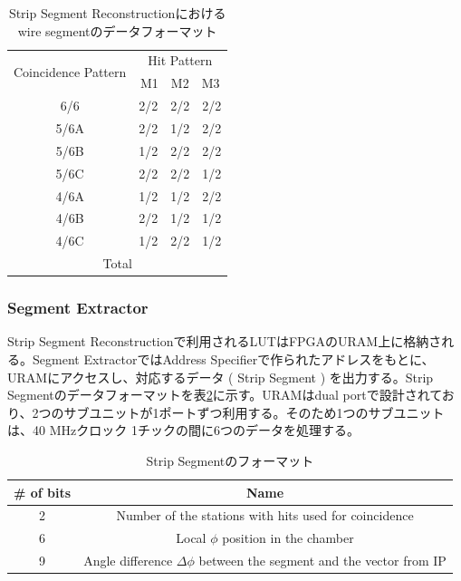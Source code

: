 \begin{table}[]
    \centering
    \caption{Strip Segment Reconstructionにおけるwire segmentのデータフォーマット}
    \label{tab:SegmentReco_strip}
    \begin{tabular}{|cc|}
    \hline
    \multicolumn{1}{|c|}{\multirow{2}{*}{Coincidence Pattern}} & Hit Pattern \\ \cline{2-2} 
    \multicolumn{1}{|c|}{}                                     & M1　M2　M3    \\ \hline\hline
    \multicolumn{1}{|c|}{6/6}                                  & 2/2　2/2　2/2 \\ \hline
    \multicolumn{1}{|c|}{5/6A}                                 & 2/2　1/2　2/2 \\ \hline
    \multicolumn{1}{|c|}{5/6B}                                 & 1/2　2/2　2/2 \\ \hline
    \multicolumn{1}{|c|}{5/6C}                                 & 2/2　2/2　1/2 \\ \hline
    \multicolumn{1}{|c|}{4/6A}                                 & 1/2　1/2　2/2 \\ \hline
    \multicolumn{1}{|c|}{4/6B}                                 & 2/2　1/2　1/2 \\ \hline
    \multicolumn{1}{|c|}{4/6C}                                 & 1/2　2/2　1/2 \\ \hline\hline
    \multicolumn{2}{|c|}{Total}                                              \\ \hline
    \end{tabular}
\end{table}

\subsubsection*{Segment Extractor}
Strip Segment Reconstructionで利用されるLUTはFPGAのURAM上に格納される。Segment ExtractorではAddress Specifierで作られたアドレスをもとに、URAMにアクセスし、対応するデータ ( Strip Segment ) を出力する。Strip Segmentのデータフォーマットを表\ref{tab:StripSegment}に示す。URAMはdual portで設計されており、2つのサブユニットが1ポートずつ利用する。そのため1つのサブユニットは、40 MHzクロック 1チックの間に6つのデータを処理する。

\begin{table}[]
    \centering
    \caption{Strip Segmentのフォーマット}
    \label{tab:StripSegment}
    \begin{tabular}{|c|c|}
    \hline
    \# of bits & Name                                                                     \\ \hline\hline
    2          & Number of the stations with hits used for coincidence                    \\ \hline
    6          & Local $\phi$ position in the chamber                                     \\ \hline
    9          & Angle difference $\Delta\phi$ between the segment and the vector from IP \\ \hline
    \end{tabular}
\end{table}

